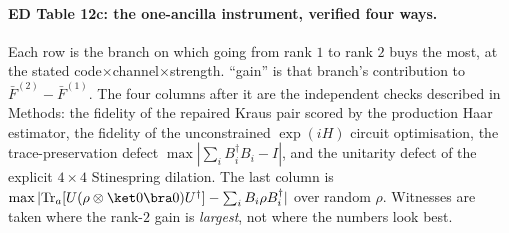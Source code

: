 \documentclass[10pt,a4paper]{article}
\begin{document}
\paragraph*{ED Table 12c: the one-ancilla instrument, verified four ways.}
Each row is the branch on which going from rank $1$ to rank $2$ buys the most, at
the stated code$\times$channel$\times$strength.  ``gain'' is that branch's
contribution to $\bar F^{(2)}-\bar F^{(1)}$.  The four columns after it are the
independent checks described in Methods: the fidelity of the repaired Kraus pair
scored by the production Haar estimator, the fidelity of the unconstrained
$\exp(iH)$ circuit optimisation, the trace-preservation defect
$\max|\sum_iB_i^\dagger B_i-I|$, and the unitarity defect of the explicit
$4\times4$ Stinespring dilation.  The last column is
$\max|\mathrm{Tr}_a[U(\rho\otimes\ket0\bra0)U^\dagger]-\sum_iB_i\rho
B_i^\dagger|$ over random $\rho$.  Witnesses are taken where the rank-$2$ gain is
\emph{largest}, not where the numbers look best.
\end{document}
